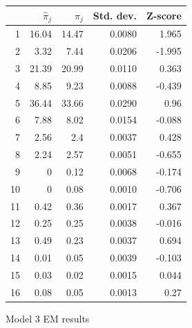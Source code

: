 \documentclass[12pt]{amsart}
\begin{document}
\begin{figure}

\begin{tabular}{r| r| r| r| r|}
		& $\hat{\pi}_j$ & $\pi_j$ & Std. dev. & Z-score	\\
		\hline
1	& 16.04   &     14.47   &         0.0080    &    1.965      \\
2	&  3.32   &      7.44   &         0.0206   &   -1.995      \\
3	& 21.39   &     20.99   &         0.0110   &    0.363      \\
4	&  8.85   &      9.23   &         0.0088    &   -0.439      \\
5	& 36.44   &     33.66   &         0.0290   &     0.96      \\
6	&  7.88   &      8.02   &         0.0154   &   -0.088      \\
7	&  2.56   &       2.4   &         0.0037    &    0.428      \\
8	&  2.24   &      2.57   &         0.0051    &   -0.655      \\
9	&     0   &      0.12   &         0.0068    &   -0.174      \\
10	&     0   &      0.08   &         0.0010    &   -0.706      \\
11	&  0.42   &      0.36   &         0.0017   &    0.367      \\
12	&  0.25   &      0.25   &         0.0038    &   -0.016      \\
13	&  0.49   &      0.23   &         0.0037    &    0.694      \\
14	&  0.01   &      0.05   &         0.0039    &   -0.103      \\
15	&  0.03   &      0.02   &         0.0015    &    0.044      \\
16	&  0.08   &      0.05   &         0.0013    &     0.27      \\   		\end{tabular}
\caption{Model 3 EM results}
\end{figure}
               
\end{document}
